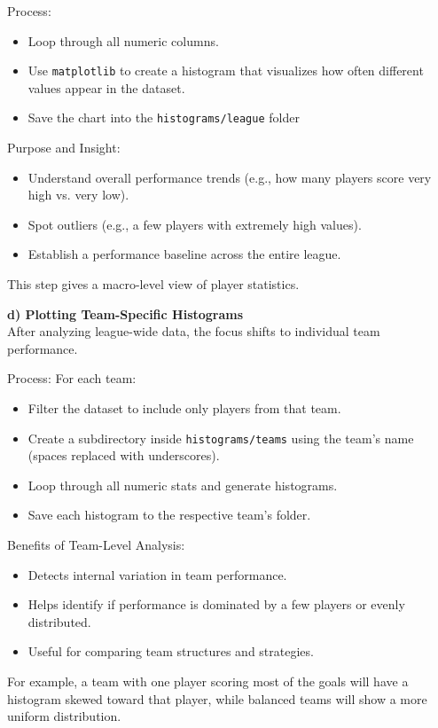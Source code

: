 \documentclass[a4paper,12pt]{article}
\begin{document}
Process:
\begin{itemize}
    \item Loop through all numeric columns.
    \item Use \texttt{matplotlib} to create a histogram that visualizes how often different values appear in the dataset.
    \item Save the chart into the \texttt{histograms/league} folder
\end{itemize}

Purpose and Insight:
\begin{itemize}
    \item Understand overall performance trends (e.g., how many players score very high vs. very low).
    \item Spot outliers (e.g., a few players with extremely high values).
    \item Establish a performance baseline across the entire league.
\end{itemize}
This step gives a macro-level view of player statistics.

\textbf{d) Plotting Team-Specific Histograms} \\
After analyzing league-wide data, the focus shifts to individual team performance.

Process: For each team:
\begin{itemize}
    \item Filter the dataset to include only players from that team.
    \item Create a subdirectory inside \texttt{histograms/teams} using the team’s name (spaces replaced with underscores).
    \item Loop through all numeric stats and generate histograms.
    \item Save each histogram to the respective team’s folder.
\end{itemize}

Benefits of Team-Level Analysis:
\begin{itemize}
    \item Detects internal variation in team performance.
    \item Helps identify if performance is dominated by a few players or evenly distributed.
    \item Useful for comparing team structures and strategies.
\end{itemize}
For example, a team with one player scoring most of the goals will have a histogram skewed toward that player, while balanced teams will show a more uniform distribution.
\end{document}
